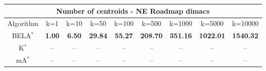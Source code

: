 \begin{tabular}{c|cccccccc}\toprule
\multicolumn{9}{c}{Number of centroids - NE Roadmap dimacs}\\ \midrule
Algorithm & k=1 & k=10 & k=50 & k=100 & k=500 & k=1000 & k=5000 & k=10000 \\ \midrule
BELA$^*$ & \textbf{1.00} & \textbf{6.50} & \textbf{29.84} & \textbf{55.27} & \textbf{208.70} & \textbf{351.16} & \textbf{1022.01} & \textbf{1540.32} \\
K$^*$ & -- & -- & -- & -- & -- & -- & -- & -- \\
mA$^*$ & -- & -- & -- & -- & -- & -- & -- & -- \\ \bottomrule 
\end{tabular}
